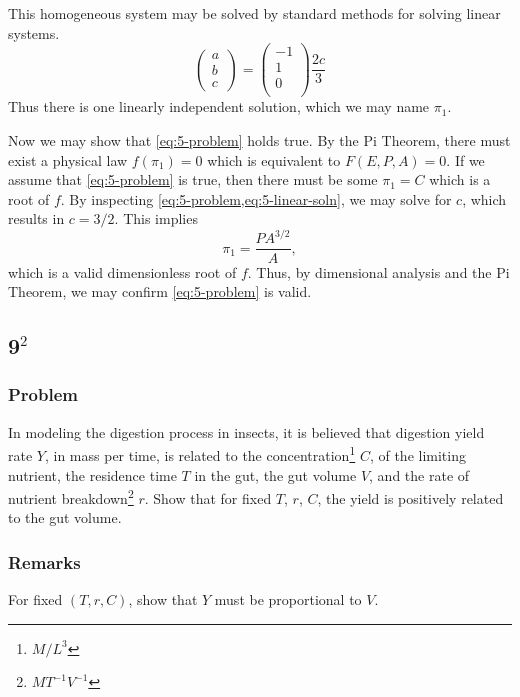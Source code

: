 \documentclass[12pt]{article}
\begin{document}
  This homogeneous system may be solved by standard methods for solving linear
  systems.
  \begin{equation}
    \label{eq:5-linear-soln}
    \begin{pmatrix}
      a \\ b \\ c \
    \end{pmatrix} =
    \begin{pmatrix}
      -1 \\
      1 \\
      0 \\
    \end{pmatrix}\frac{2c}{3}
  \end{equation}
  Thus there is one linearly independent solution, which we may name $\pi_1$.

  Now we may show that \cref{eq:5-problem} holds true. By the Pi Theorem, there
  must exist a physical law $f(\pi_1)=0$ which is equivalent to $F(E,P,A)=0$. If
  we assume that \cref{eq:5-problem} is true, then there must be some $\pi_1=C$
  which is a root of $f$. By inspecting \cref{eq:5-problem,eq:5-linear-soln}, we
  may solve for $c$, which results in $c=3/2$. This implies
  \begin{equation*}
    \pi_1 = \frac{PA^{3/2}}{A},
  \end{equation*}
  which is a valid dimensionless root of $f$. Thus, by dimensional analysis and
  the Pi Theorem, we may confirm \cref{eq:5-problem} is valid.

  \newpage
\subsection{9$^2$}
  \subsubsection*{Problem}
  In modeling the digestion process in insects, it is believed that digestion
  yield rate $Y$, in mass per time, is related to the
  concentration\footnote{$M/L^3$} $C$, of the limiting nutrient, the residence
  time $T$ in the gut, the gut volume $V$, and the rate of nutrient
  breakdown\footnote{$MT^{-1}V^{-1}$} $r$. Show that for fixed $T$, $r$, $C$,
  the yield is positively related to the gut volume.

  \subsubsection*{Remarks}
  For fixed $(T,r,C)$, show that $Y$ must be proportional to $V$.
\end{document}
